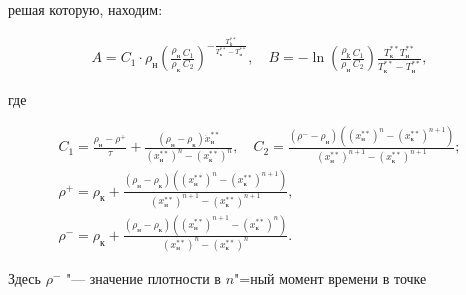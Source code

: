 решая которую, находим:

\begin{gather*}


A=C_1 \cdot \rho_\text{н} \left(\frac{\rho_\text{н}}{\rho_\text{к}}\frac{C_1}{C_2

}\right)^{-\frac{T_\text{k}^{\ast \ast }}{T_\text{к}^{\ast \ast }

-T_\text{н}^{\ast \ast}}},\quad 


B=-\ln \left(\frac{\rho_\text{k}}{\rho_\text{н}} \frac{C_1}{C_2} \right) \frac{T_\text{к}^{\ast \ast} T_\text{н}^{\ast \ast} }{T_\text{к}^{\ast

\ast} -T_\text{н}^{\ast \ast}},

\end{gather*}

где

\begin{gather*}

C_1 =\frac{\rho_\text{н} - \rho^+}{\tau }+\frac{(\rho_\text{н} - \rho_\text{к}

)\dot {x}_\text{н}^{\ast \ast }}{(x_\text{н}^{\ast \ast})^n - (x_\text{к}^{\ast \ast}

)^n}, \quad C_2 = \frac{(\rho^- - \rho_\text{н}) \left( (x_\text{н}^{\ast \ast}

)^n - (x_\text{к}^{\ast \ast})^{n+1} \right)}{(x_\text{н}^{\ast \ast}

)^{n+1}-(x_\text{к}^{\ast \ast})^{n+1}};\\

\rho^+ = \rho_\text{к} + \frac{(\rho_\text{н} -\rho_\text{к} ) \left( (x_\text{н}^{\ast \ast}

)^n - (x_\text{к}^{\ast \ast})^{n+1} \right)}{(x_\text{н}^{\ast \ast}

)^{n+1}-(x_\text{к}^{\ast \ast})^{n+1}},

\\

\rho^- = \rho_\text{к} + \frac{(\rho_\text{н} - \rho_\text{к} ) \left( (x_\text{н}^{\ast \ast }

)^{n+1}-(x_\text{к}^{\ast \ast})^n \right)}{(x_\text{н}^{\ast \ast}

)^n-(x_\text{к}^{\ast \ast })^n}.

\end{gather*}

Здесь $\rho^-$ "--- значение плотности в $n$"=ный момент времени в точке

